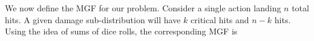 \documentclass{article}
\begin{document}
        We now define the MGF for our problem. Consider a single action landing $n$ total hits. A given damage sub-distribution will have $k$ critical hits and $n-k$ hits. Using the idea of sums of dice rolls, the corresponding MGF is

        





\end{document}
